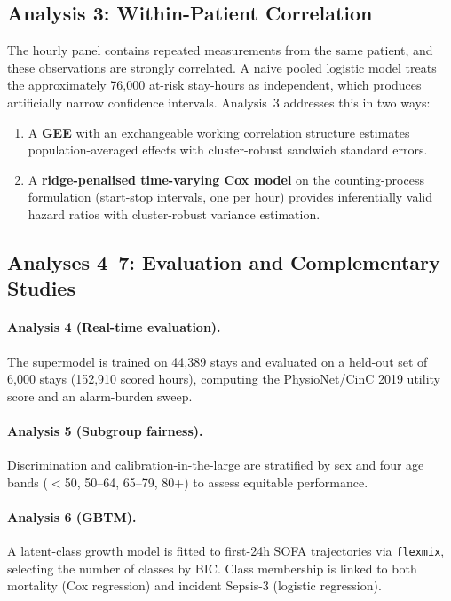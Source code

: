 \subsection{Analysis 3: Within-Patient Correlation}

The hourly panel contains repeated measurements from the same patient, and
these observations are strongly correlated. A naive pooled logistic model
treats the approximately 76{,}000 at-risk stay-hours as independent, which
produces artificially narrow confidence intervals. Analysis~3 addresses this in
two ways:

\begin{enumerate}
  \item A \textbf{GEE} with an exchangeable working correlation structure
  estimates population-averaged effects with cluster-robust sandwich standard
  errors.
  \item A \textbf{ridge-penalised time-varying Cox model} on the
  counting-process formulation (start-stop intervals, one per hour) provides
  inferentially valid hazard ratios with cluster-robust variance estimation.
\end{enumerate}

\subsection{Analyses 4--7: Evaluation and Complementary Studies}

\paragraph{Analysis 4 (Real-time evaluation).} The supermodel is trained on
44{,}389 stays and evaluated on a held-out set of 6{,}000 stays (152{,}910
scored hours), computing the PhysioNet/CinC 2019 utility score and an
alarm-burden sweep.

\paragraph{Analysis 5 (Subgroup fairness).} Discrimination and calibration-in-the-large are stratified by sex and four age bands ($<$50, 50--64, 65--79,
80+) to assess equitable performance.

\paragraph{Analysis 6 (GBTM).} A latent-class growth model
\cite{yang2022gbtm} is fitted to first-24h SOFA trajectories via
\texttt{flexmix}, selecting the number of classes by BIC. Class membership is
linked to both mortality (Cox regression) and incident Sepsis-3 (logistic
regression).

